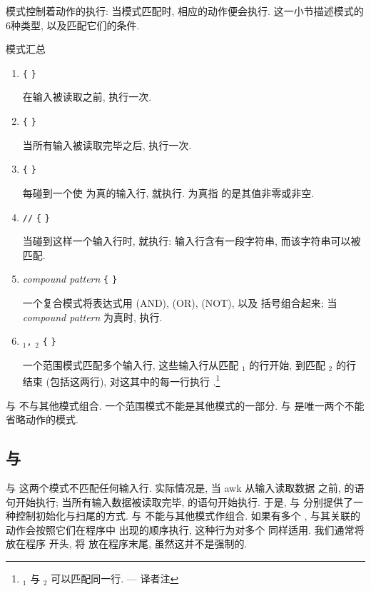 模式控制着动作的执行: 当模式匹配时, 相应的动作便会执行. 
这一小节描述模式的6种类型, 以及匹配它们的条件.
\begin{summary}{模式汇总}
    \begin{enumerate}
        \item \BEGIN \verb'{' \stmt \verb'}' \par
            在输入被读取之前, \stmt 执行一次.
        \item \END \verb'{' \stmt \verb'}'      \par
            当所有输入被读取完毕之后, \stmt 执行一次.
        \item \expr \verb'{' \stmt \verb'}' \par
            每碰到一个使 \expr 为真的输入行, \stmt 就执行. \expr 为真指
            的是其值非零或非空.
        \item \verb'/'\regexpr\verb'/' \verb'{' \stmt \verb'}' \par
            当碰到这样一个输入行时, \stmt 就执行: 输入行含有一段字符串,
            而该字符串可以被 \regexpr 匹配.
        \item \textit{compound pattern} \verb'{' \stmt \verb'}' \par
            一个复合模式将表达式用 \AND{}(AND), \OR{}(OR), \NOT{}(NOT), 以及
            括号组合起来; 当 \textit{compound pattern} 为真时, \stmt 执行.
        \item \pat$_1$\verb',' \pat$_2$ \verb'{' \stmt{}\verb'}' \par
            一个范围模式匹配多个输入行, 这些输入行从匹配 \pat$_1$ 的行开始,
            到匹配 \pat$_2$ 的行结束 (包括这两行), 对这其中的每一行执行
            \stmt.\footnote{\pat$_1$ 与 \pat$_2$ 可以匹配同一行. --- 译者注}
    \end{enumerate}
    \BEGIN 与 \END 不与其他模式组合. 一个范围模式不能是其他模式的一部分.
    \BEGIN 与 \END 是唯一两个不能省略动作的模式.
\end{summary}

\subsection{\BEGIN 与 \END}
\label{subsec:the_awk_language_begin_and_end}

\BEGIN 与 \END 这两个模式不匹配任何输入行. 实际情况是, 当 awk 从输入读取数据
之前, \BEGIN 的语句开始执行;
当所有输入数据被读取完毕, \END 的语句开始执行.
于是, \BEGIN 与 \END 分别提供了一种控制初始化与扫尾的方式. \BEGIN 与 \END
不能与其他模式作组合. 如果有多个 \BEGIN, 与其关联的动作会按照它们在程序中
出现的顺序执行, 这种行为对多个 \END 同样适用. 我们通常将 \BEGIN 放在程序
开头, 将 \END 放在程序末尾, 虽然这并不是强制的.


